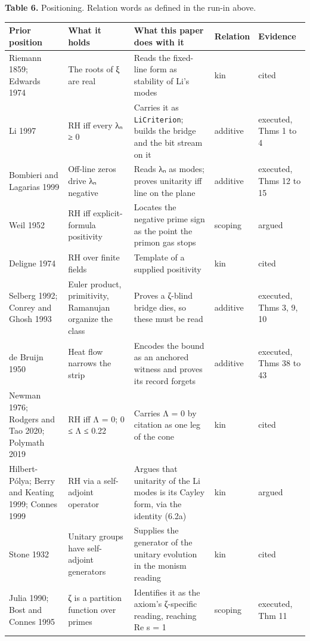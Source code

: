 \documentclass[10pt,twocolumn]{article}
\begin{document}
\begin{table}[!t]
\centering\small
\renewcommand{\arraystretch}{1.12}
\raggedright \textbf{Table 6.} Positioning. Relation words as defined in the run-in above.\par\smallskip
\begin{tabularx}{\textwidth}{@{}P{0.18\textwidth} P{0.19\textwidth} L P{0.115\textwidth} P{0.115\textwidth}@{}}
\toprule
\textbf{Prior position} & \textbf{What it holds} & \textbf{What this paper does with it} & \textbf{Relation} & \textbf{Evidence} \\
\midrule
Riemann 1859; Edwards 1974 & The roots of ξ are real & Reads the fixed-line form as stability of Li's modes & kin & cited \\
Li 1997 & RH iff every λₙ ≥ 0 & Carries it as \texttt{LiCriterion}; builds the bridge and the bit stream on it & additive & executed, Thms 1 to 4 \\
Bombieri and Lagarias 1999 & Off-line zeros drive λₙ negative & Reads λₙ as modes; proves unitarity iff line on the plane & additive & executed, Thms 12 to 15 \\
Weil 1952 & RH iff explicit-formula positivity & Locates the negative prime sign as the point the primon gas stops & scoping & argued \\
Deligne 1974 & RH over finite fields & Template of a supplied positivity & kin & cited \\
Selberg 1992; Conrey and Ghosh 1993 & Euler product, primitivity, Ramanujan organize the class & Proves a ζ-blind bridge dies, so these must be read & additive & executed, Thms 3, 9, 10 \\
de Bruijn 1950 & Heat flow narrows the strip & Encodes the bound as an anchored witness and proves its record forgets & additive & executed, Thms 38 to 43 \\
Newman 1976; Rodgers and Tao 2020; Polymath 2019 & RH iff Λ = 0; 0 ≤ Λ ≤ 0.22 & Carries Λ = 0 by citation as one leg of the cone & kin & cited \\
Hilbert-Pólya; Berry and Keating 1999; Connes 1999 & RH via a self-adjoint operator & Argues that unitarity of the Li modes is its Cayley form, via the identity (6.2a) & kin & argued \\
Stone 1932 & Unitary groups have self-adjoint generators & Supplies the generator of the unitary evolution in the monism reading & kin & cited \\
Julia 1990; Bost and Connes 1995 & ζ is a partition function over primes & Identifies it as the axiom's ζ-specific reading, reaching Re s = 1 & scoping & executed, Thm 11 \\

\end{tabularx}
\end{table}
\end{document}
